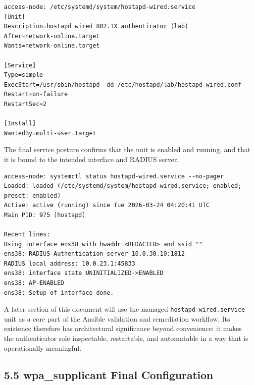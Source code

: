 \documentclass[11pt]{article}
\begin{document}
\begin{verbatim}
access-node: /etc/systemd/system/hostapd-wired.service
[Unit]
Description=hostapd wired 802.1X authenticator (lab)
After=network-online.target
Wants=network-online.target

[Service]
Type=simple
ExecStart=/usr/sbin/hostapd -dd /etc/hostapd/lab/hostapd-wired.conf
Restart=on-failure
RestartSec=2

[Install]
WantedBy=multi-user.target
\end{verbatim}

The final service posture confirms that the unit is enabled and running, and that it is bound to the intended interface and RADIUS server.

\begin{verbatim}
access-node: systemctl status hostapd-wired.service --no-pager
Loaded: loaded (/etc/systemd/system/hostapd-wired.service; enabled; preset: enabled)
Active: active (running) since Tue 2026-03-24 04:20:41 UTC
Main PID: 975 (hostapd)

Recent lines:
Using interface ens38 with hwaddr <REDACTED> and ssid ""
ens38: RADIUS Authentication server 10.0.30.10:1812
RADIUS local address: 10.0.23.1:45833
ens38: interface state UNINITIALIZED->ENABLED
ens38: AP-ENABLED
ens38: Setup of interface done.
\end{verbatim}

A later section of this document will use the managed \texttt{hostapd-wired.service} unit as a core part of the Ansible validation and remediation workflow. Its existence therefore has architectural significance beyond convenience: it makes the authenticator role inspectable, restartable, and automatable in a way that is operationally meaningful.


\subsection{5.5 wpa\_supplicant Final Configuration}
\label{sec:wpa-supplicant-final-configuration}
\end{document}
